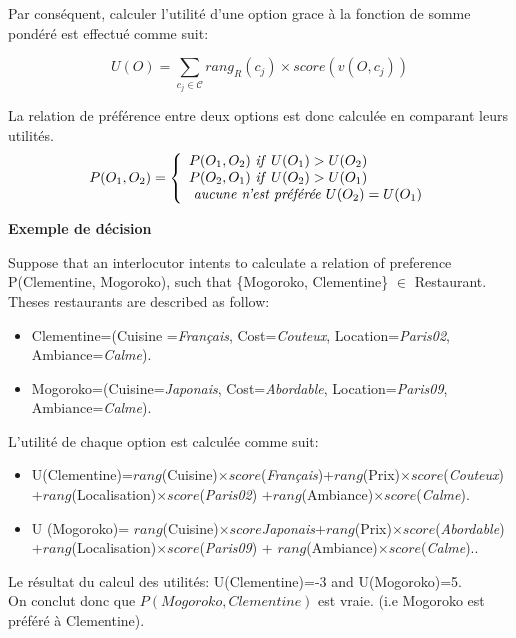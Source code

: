 \documentclass[a4paper,french]{article}
\begin{document}
Par conséquent, calculer l'utilité d'une option grace à la fonction de somme pondéré est effectué comme suit:

\[U(O) = \sum_{c_j \in \mathcal{C}}  rang_R(c_j) \times score\left( v(O, c_j) \right) \] 


\par La relation de préférence entre deux options est donc calculée en comparant leurs utilités. 
\[ P(O_1, O_2)  = \left \{
\begin{array}{l}
P(O_1, O_2)$ \textit{if}  $U(O_1) > U(O_2) \\
P(O_2, O_1)$  \textit{if}  $U(O_2) > U(O_1) \\
$  \textit{aucune n'est préférée}  $U(O_2) = U(O_1)\\
\end{array}
\right .\]

 \par \textbf{Exemple de décision}

Suppose that an interlocutor intents to calculate a relation of preference  P(Clementine, Mogoroko), such that 
\{Mogoroko, Clementine\} $\in$ Restaurant. Theses restaurants are described as follow: 
\begin{itemize}
	\item Clementine=(Cuisine =\textit{Français}, Cost=\textit{Couteux}, Location=\textit{Paris02},
	\\Ambiance=\textit{Calme}).
	\item Mogoroko=(Cuisine=\textit{Japonais}, Cost=\textit{Abordable}, Location=\textit{Paris09}, 
	\\Ambiance=\textit{Calme}).
\end{itemize}

L'utilité de chaque option est calculée comme suit:
\begin{itemize}
	\item U(Clementine)=$rang$(Cuisine)$\times score$(\textit{Français})+$rang$(Prix)$\times score$(\textit{Couteux})\\+$rang$(Localisation)$\times score$(\textit{Paris02})
	+$rang$(Ambiance)$\times score$(\textit{Calme}).
	\item U (Mogoroko)= $rang$(Cuisine)$\times score$\textit{Japonais}+$rang$(Prix)$\times score$(\textit{Abordable})\\+$rang$(Localisation)$\times score$(\textit{Paris09}) +  
	$rang$(Ambiance)$\times score$(\textit{Calme})..
\end{itemize}
Le résultat du calcul des utilités: U(Clementine)=-3 and U(Mogoroko)=5.
\\  On conclut donc que $P(Mogoroko, Clementine)$ est vraie.
(i.e Mogoroko est préféré à Clementine).
\end{document}
